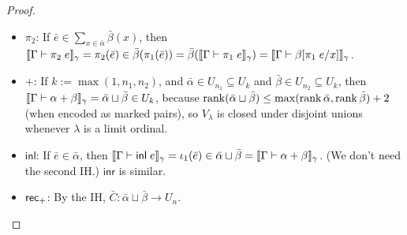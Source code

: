 \begin{proof}
\begin{itemize}
\item $\pi_2$: If $\bar e\in \sum_{x\in\bar\alpha}\bar\beta(x)$, then $\scott{\Gamma\vdash\pi_2\;e}_\gamma=\pi_2(\bar e)\in\bar\beta(\pi_1(\bar e))=\bar\beta(\scott{\Gamma\vdash\pi_1\;e}_\gamma)=\scott{\Gamma\vdash\beta[\pi_1\;e/x]}_\gamma$.
\item $+$: If $k:=\max(1,n_1,n_2)$, and $\bar\alpha\in U_{n_1}\subseteq U_k$ and $\bar\beta\in U_{n_2}\subseteq U_k$, then $\scott{\Gamma\vdash\alpha+\beta}_\gamma=\bar\alpha\sqcup\bar\beta\in U_k$, because $\operatorname{rank}(\bar\alpha\sqcup \bar\beta)\le\max(\operatorname{rank} \bar\alpha,\operatorname{rank} \bar\beta)+2$ (when encoded as marked pairs), so $V_\lambda$ is closed under disjoint unions whenever $\lambda$ is a limit ordinal.
\item $\mathsf{inl}$: If $\bar e\in\bar\alpha$, then $\scott{\Gamma\vdash\inl e}_\gamma=\iota_1(\bar e)\in\bar\alpha\sqcup\bar\beta=\scott{\Gamma\vdash\alpha+\beta}_\gamma$. (We don't need the second IH.) $\mathsf{inr}$ is similar.
\item $\mathsf{rec}_+$: By the IH, $\bar C:\bar\alpha\sqcup\bar\beta\to U_n$.


\end{itemize}
\end{proof}
